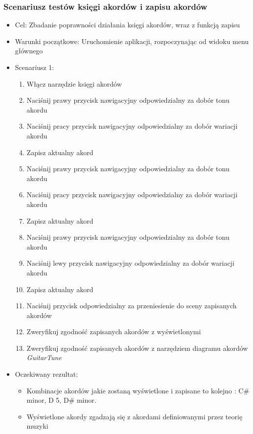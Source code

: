 \subsubsection{Scenariusz testów księgi akordów i zapisu akordów}

\begin{itemize}
    \item Cel: Zbadanie poprawności działania księgi akordów, wraz z funkcją zapisu
    \item Warunki początkowe: Uruchomienie aplikacji, rozpoczynając od widoku menu głównego
    \item Scenariusz 1: 
        \begin{enumerate}
            \item Włącz narzędzie księgi akordów
            \item Naciśnij prawy przycisk nawigacyjny odpowiedzialny za dobór tonu akordu
            \item Naciśnij pracy przycisk nawigacyjny odpowiedzialny za dobór wariacji akordu
            \item Zapisz aktualny akord
            \item Naciśnij prawy przycisk nawigacyjny odpowiedzialny za dobór tonu akordu
            \item Naciśnij pracy przycisk nawigacyjny odpowiedzialny za dobór wariacji akordu
            \item Zapisz aktualny akord
            \item Naciśnij prawy przycisk nawigacyjny odpowiedzialny za dobór tonu akordu
            \item Naciśnij lewy przycisk nawigacyjny odpowiedzialny za dobór wariacji akordu
            \item Zapisz aktualny akord
            \item Naciśnij przycisk odpowiedzialny za przeniesienie do sceny zapisanych akordów
            \item Zweryfikuj zgodność zapisanych akordów z wyświetlonymi
            \item Zweryfikuj zgodność zapisanych akordów z narzędziem diagramu akordów \emph{GuitarTune}
        \end{enumerate}
    \item Oczekiwany rezultat: 
        \begin{itemize}
            \item Kombinacje akordów jakie zostaną wyświetlone i zapisane to kolejno : C\# minor, D 5, D\# minor. 
            \item Wyświetlone akordy zgadzają się z akordami definiowanymi przez teorię muzyki

\end{itemize}
\end{itemize}
